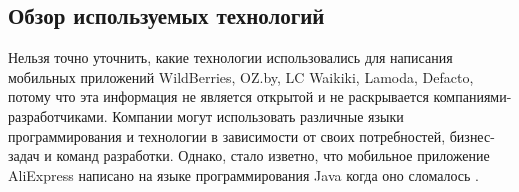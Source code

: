 



\subsection{Обзор используемых технологий}

Нельзя точно уточнить, какие технологии использовались для написания мобильных приложений
WildBerries, OZ.by, LC Waikiki, Lamoda, Defacto,
потому что эта информация не является открытой и не раскрывается компаниями-разработчиками.
Компании могут использовать различные языки программирования и технологии в зависимости от своих потребностей,
бизнес-задач и команд разработки. Однако, стало изветно, что мобильное приложение AliExpress
написано на языке программирования Java когда оно сломалось \cite{AliExpressLang} \cite{AliExpressLangForum}.

